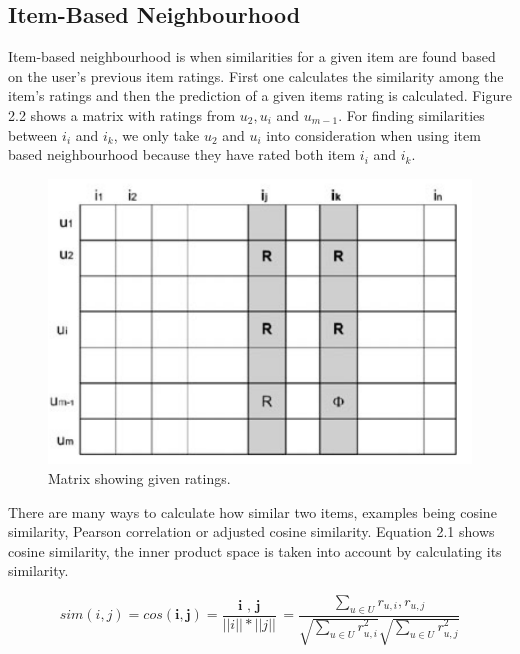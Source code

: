 \subsection{Item-Based Neighbourhood }

Item-based neighbourhood is when similarities for a given item are found based on the user's previous item ratings. First one calculates the similarity among the item's ratings and then the prediction of a given items rating is calculated. Figure 2.2 shows a matrix with ratings from  $u_{2}, u_{i}$ and $u_{m-1}$. For finding similarities between $i_{i}$ and $i_{k}$, we only take $u_{2}$ and  $u_{i}$ into consideration when using item based neighbourhood because they have rated both item $i_{i}$ and $i_{k}$.  

\begin{figure}[H]
	\includegraphics[scale=0.65]{images/neigbourhood_based}
	\centering
	\caption{Matrix showing given ratings. \citep{celma_recommendation_2010}} 
\end{figure}

There are many ways to calculate how similar two items, examples being cosine similarity, Pearson correlation or adjusted cosine similarity. Equation 2.1 shows cosine similarity, the inner product space is taken into account by calculating its similarity.

\begin{equation}
		sim(i , j) = cos( \textbf{i}, \textbf{j} ) = \frac{ \textbf{ i }, \textbf{ j }}{ || i || * || j || } = \frac{ \sum_{ u \in U } r_{ u, i }, r_{ u, j }} { \sqrt{ \sum _{  u \in U } r^{2}_{ u , i}} \sqrt{ \sum _{  u \in U } r^{2}_{ u , j}}}
\end{equation}

